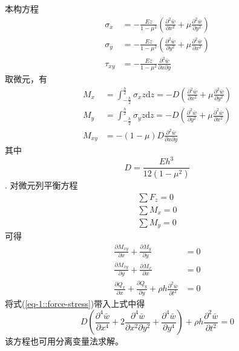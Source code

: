 本构方程
\begin{equation}
    \begin{aligned}
        \sigma_{x}&=-\frac{Ez}{1-\mu^{2}}\left(\frac{\partial^{2}\bar{w}}{\partial x^{2}}+\mu\frac{\partial^{2}\bar{w}}{\partial y^{2}}\right)\\
        \sigma_{y}&=-\frac{Ez}{1-\mu^{2}}\left(\frac{\partial^{2}\bar{w}}{\partial y^{2}}+\mu\frac{\partial^{2}\bar{w}}{\partial x^{2}}\right)\\
        \tau_{xy}&=-\frac{Ez}{1-\mu^{2}}\frac{\partial^{2}\bar{w}}{\partial x\partial y}
    \end{aligned}
\end{equation}
取微元，有
\begin{equation}\label{eq-1::force-stress}
    \begin{aligned}
        M_{x}&=\int_{-\frac{h}{2}}^{\frac{h}{2}}\sigma_{x}z\mathrm{d}z=-D\left(\frac{\partial^{2}\bar{w}}{\partial x^{2}}+\mu\frac{\partial^{2}\bar{w}}{\partial y^{2}}\right)\\
        M_{y}&=\int_{-\frac{h}{2}}^{\frac{h}{2}}\sigma_{y}z\mathrm{d}z=-D\left(\frac{\partial^{2}\bar{w}}{\partial y^{2}}+\mu\frac{\partial^{2}\bar{w}}{\partial x^{2}}\right)\\
        M_{xy}&=-(1-\mu)D\frac{\partial^{2}\bar{w}}{\partial x\partial y}
    \end{aligned}
\end{equation}
其中$$D=\frac{Eh^{3}}{12(1-\mu^{2})}$$.
对微元列平衡方程
\begin{equation}
    \begin{aligned}
        \sum F_z=0\\
        \sum M_x=0\\
        \sum M_y=0
    \end{aligned}
\end{equation}
可得
\begin{equation}
    \begin{aligned}
        \frac{\partial M_{xy}}{\partial x} + \frac{\partial M_{y}}{\partial y}&=0\\
        \frac{\partial M_{xy}}{\partial y} + \frac{\partial M_{x}}{\partial x}&=0\\
        \frac{\partial Q_{x}}{\partial x} + \frac{\partial Q_{y}}{\partial y} + \rho h\frac{\partial^{2} \bar{w}}{\partial t^{2}}&=0
    \end{aligned}
\end{equation}
将式(\ref{eq-1::force-stress})带入上式中得
\begin{equation}\label{eq-1::plate-vibration}
    D\left(\frac{\partial^{4}\bar{w}}{\partial x^{4}} + 
    2\frac{\partial^{4}\bar{w}}{\partial x^{2}\partial y^{2}} + 
    \frac{\partial^{4}\bar{w}}{\partial y^{4}}\right) + 
    \rho h\frac{\partial^{2} \bar{w}}{\partial t^{2}} =0
\end{equation}
该方程也可用分离变量法求解。

